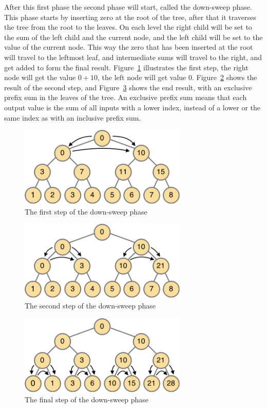 \documentclass[a4paper]{article}
\begin{document}
After this first phase the second phase will start, called the down-sweep phase. This phase starts by inserting zero at the root of the tree, after that it traverses the tree from the root to the leaves. On each level the right child will be set to the sum of the left child and the current node, and the left child will be set to the value of the current node. This way the zero that has been inserted at the root will travel to the leftmost leaf, and intermediate sums will travel to the right, and get added to form the final result. Figure~\ref{treeDownSweepFirst} illustrates the first step, the right node will get the value $0+10$, the left node will get value $0$. Figure~\ref{treeDownSweepSecond} shows the result of the second step, and Figure~\ref{treeDownSweepFinal} shows the end result, with an exclusive prefix sum in the leaves of the tree. An exclusive prefix sum means that each output value is the sum of all inputs with a lower index, instead of a lower or the same index as with an inclusive prefix sum.

\begin{figure}[htb!]
	\centering
	\includegraphics[width=80mm]{../images/tree-downsweep-first.png}
	\caption{The first step of the down-sweep phase}
	\label{treeDownSweepFirst}
\end{figure}

\begin{figure}[htb!]
	\centering
	\includegraphics[width=80mm]{../images/tree-downsweep-second.png}
	\caption{The second step of the down-sweep phase}
	\label{treeDownSweepSecond}
\end{figure}

\begin{figure}[htb!]
	\centering
	\includegraphics[width=80mm]{../images/tree-downsweep-final.png}
	\caption{The final step of the down-sweep phase}
	\label{treeDownSweepFinal}
\end{figure}
\FloatBarrier
\end{document}

